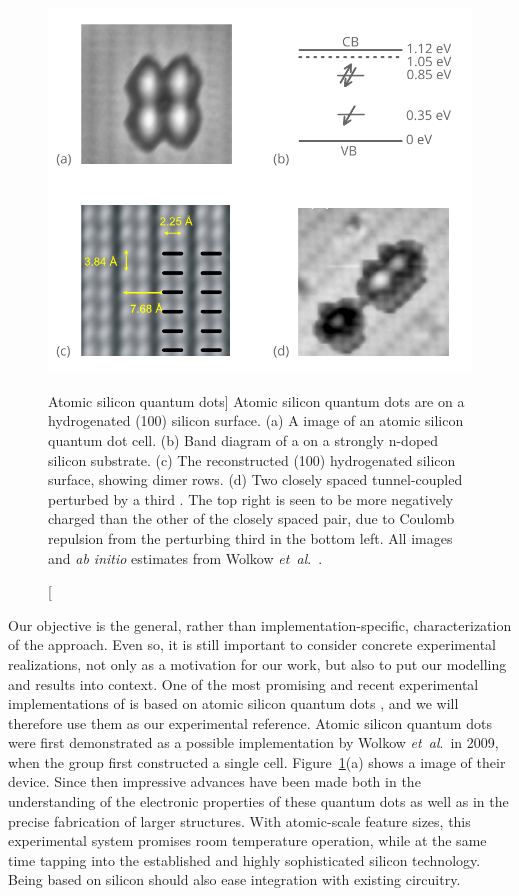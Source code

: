 \begin{figure}
  \center
  \includegraphics{silicon}
  \caption
[Atomic silicon quantum dots]
{
\label{fig:silicon}
Atomic silicon quantum dots are \emph{} on a hydrogenated (100)
silicon surface. (a) A  image of an atomic silicon quantum dot
 cell. (b) Band diagram of a  on a strongly n-doped silicon
substrate. (c) The reconstructed (100) hydrogenated silicon surface, showing
dimer rows. (d) Two closely spaced tunnel-coupled  perturbed by a
third . The top right  is seen to be more negatively charged
than the other  of the closely spaced pair, due to Coulomb repulsion
from the perturbing third  in the bottom left. All  images
and \emph{ab initio} estimates from Wolkow \emph{et~al}.\
\cite{wolkow2013silicon, pitters2011tunnel}.
}
\end{figure}

Our objective is the general, rather than implementation-specific,
characterization of the \cgls{QCA} approach. Even so, it is still important to
consider concrete experimental realizations, not only as a motivation for our
work, but also to put our modelling and results into context. One of the most
promising and recent experimental implementations of \cgls{QCA} is based on
atomic silicon quantum dots \cite{haider2009controlled, pitters2011tunnel,
wolkow2013silicon}, and we will therefore use them as our experimental
reference. Atomic silicon quantum dots were first demonstrated as a possible
 implementation by Wolkow \emph{et~al}.\ in 2009, when the group first
constructed a single \cgls{QCA} cell. Figure~\ref{fig:silicon}(a) shows a
\cgls{STM} image of their device. Since then impressive advances have been made
both in the understanding of the electronic properties of these quantum dots as
well as in the precise fabrication of larger \cgls{QCA} structures. With
atomic-scale feature sizes, this experimental system promises room temperature
operation, while at the same time tapping into the established and highly
sophisticated silicon technology. Being based on silicon should also ease
integration with existing \cgls{CMOS} circuitry.


